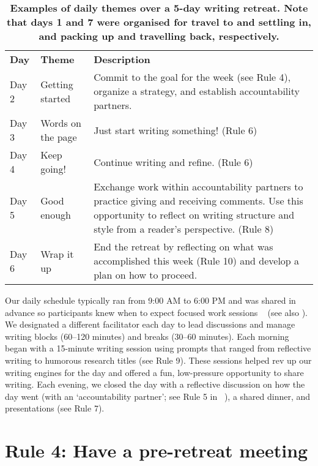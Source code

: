 \documentclass[10pt,letterpaper]{article}
\newlength\savedwidth
\newcommand\thickhline{\noalign{\global\savedwidth\arrayrulewidth\global\arrayrulewidth 2pt}%
\hline
\noalign{\global\arrayrulewidth\savedwidth}}
\begin{document}
\begin{table}[!ht]
\centering
\caption{{\bf Examples of daily themes over a 5-day writing retreat. Note that days 1 and 7 were organised for travel to and settling in, and packing up and travelling back, respectively.}}
\begin{tabular}{p{1in}p{2in}p{2in}}
\hline
{\bf Day} & {\bf Theme} & {\bf Description}\\ \thickhline
Day 2 & Getting started & Commit to the goal for the week (see Rule 4), organize a strategy, and establish accountability partners.\\ \hline
Day 3 & Words on the page & Just start writing something! (Rule 6)\\ \hline
Day 4 & Keep going! & Continue writing and refine. (Rule 6)\\ \hline
Day 5 & Good enough & Exchange work within accountability partners to practice giving and receiving comments. Use this opportunity to reflect on writing structure and style from a reader's perspective. (Rule 8)\\ \hline
Day 6 & Wrap it up & End the retreat by reflecting on what was accomplished this week (Rule 10) and develop a plan on how to proceed.\\ \hline
\end{tabular}
\label{table1}
\end{table}

Our daily schedule typically ran from 9:00 AM to 6:00 PM and was shared in advance so participants knew when to expect focused work sessions ~\cite{tremblay2021} (see also ). We designated a different facilitator each day to lead discussions and manage writing blocks (60--120 minutes) and breaks (30--60 minutes). Each morning began with a 15-minute writing session using prompts that ranged from reflective writing to humorous research titles (see Rule 9). These sessions helped rev up our writing engines for the day and offered a fun, low-pressure opportunity to share writing. Each evening, we closed the day with a reflective discussion on how the day went (with an `accountability partner'; see Rule 5 in ~\cite{peterson2018}), a shared dinner, and presentations (see Rule 7).

\section*{Rule 4: Have a pre-retreat meeting}
\end{document}
